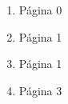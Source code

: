 \begin{question}

	\begin{enumerate}[label=1.\arabic* ]
		\item Página 0
  		\item Página 1
    	\item Página 1
        \item Página 3
	\end{enumerate}

\end{question}